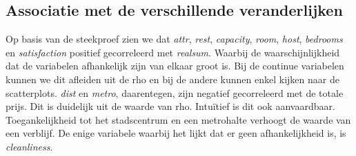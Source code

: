 \documentclass[a4paper]{kulakarticle}
\begin{document}
	\subsection{Associatie met de verschillende veranderlijken}
	
	Op basis van de steekproef zien we dat \textit{attr}, \textit{rest}, \textit{capacity}, \textit{room}, \textit{host}, \textit{bedrooms} en \textit{satisfaction} positief gecorreleerd met \textit{realsum}. Waarbij de waarschijnlijkheid dat de variabelen afhankelijk zijn van elkaar groot is. Bij de continue variabelen kunnen we dit afleiden uit de rho en bij de andere kunnen enkel kijken naar de scatterplots.  \textit{dist} en \textit{metro}, daarentegen, zijn negatief gecorreleerd met de totale prijs. Dit is duidelijk uit de waarde van rho. Intuïtief is dit ook aanvaardbaar. Toegankelijkheid tot het stadscentrum en een metrohalte verhoogt de waarde van een verblijf. De enige variabele waarbij het lijkt dat er geen afhankelijkheid is, is \textit{cleanliness}.
\end{document}
